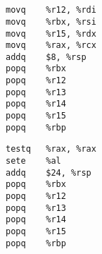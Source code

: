 \section{}\label{appendix:listings}

\begin{lstlisting}[title={Example 1 of mispredicted basic block. Measured 3.5 cycles, llvm-mca estimation: 25.04 cycles.}]
movq	%r12, %rdi
movq	%rbx, %rsi
movq	%r15, %rdx
movq	%rax, %rcx
addq	$8, %rsp
popq	%rbx
popq	%r12
popq	%r13
popq	%r14
popq	%r15
popq	%rbp
\end{lstlisting}

\begin{lstlisting}[title={Example 2 of mispredicted basic block. Measured 3.35 cycles, llvm-mca estimation: 25.03 cycles.}]
testq	%rax, %rax
sete	%al
addq	$24, %rsp
popq	%rbx
popq	%r12
popq	%r13
popq	%r14
popq	%r15
popq	%rbp
\end{lstlisting}

\section{}\label{appendix:algo}

